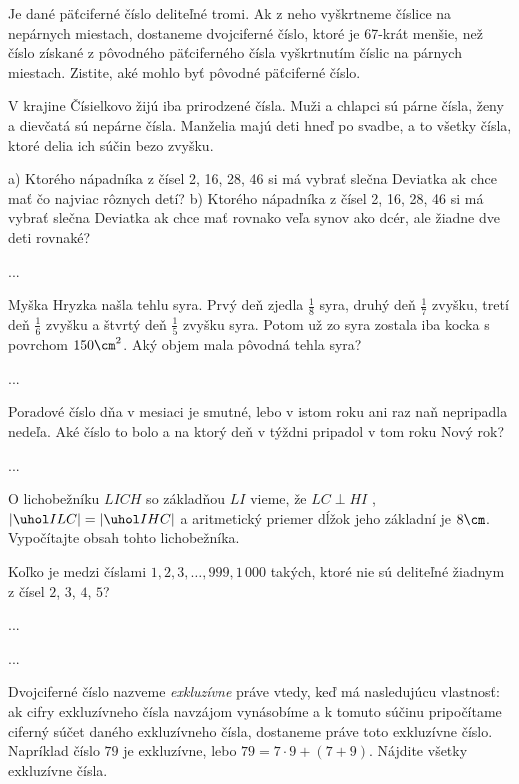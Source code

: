 {%
Je dané päťciferné číslo deliteľné tromi. Ak z neho vyškrtneme číslice na nepárnych miestach,
dostaneme dvojciferné číslo, ktoré je 67-krát menšie, než číslo získané z pôvodného
päťciferného čísla vyškrtnutím číslic na párnych miestach. Zistite, aké mohlo byť pôvodné
päťciferné číslo.}

{%
V krajine Čísielkovo žijú iba prirodzené čísla. Muži a chlapci sú párne čísla, ženy a dievčatá
sú nepárne čísla. Manželia majú deti hneď po svadbe, a to všetky čísla, ktoré delia ich súčin
bezo zvyšku.
\begin{itemize}
\ite a) Ktorého nápadníka z čísel 2, 16, 28, 46 si má vybrať slečna Deviatka ak chce mať čo
najviac rôznych detí?
\ite b) Ktorého nápadníka z čísel 2, 16, 28, 46 si má vybrať slečna Deviatka ak chce mať
rovnako veľa synov ako dcér, ale žiadne dve deti rovnaké?
\end{itemize}
}

{%
...}

{%
Myška Hryzka našla tehlu syra. Prvý deň zjedla $\frac18$ syra, druhý deň $\frac17$ zvyšku, tretí deň $\frac16$ zvyšku a štvrtý deň
$\frac15$ zvyšku syra. Potom už zo syra zostala iba kocka s povrchom $150\cm^2$.
Aký objem mala pôvodná tehla syra?}

{%
...}

{%
Poradové číslo dňa v mesiaci je smutné, lebo v istom roku ani raz naň nepripadla nedeľa. Aké
číslo to bolo a na ktorý deň v týždni pripadol v tom roku Nový rok?}

{%
...}

{%
O lichobežníku $LICH$ so základňou $LI$ vieme, že $LC\perp HI$ , $|\uhol ILC| = |\uhol IHC|$ a aritmetický
priemer dĺžok jeho základní je $8\cm$. Vypočítajte obsah tohto lichobežníka.}

{%
Koľko je medzi číslami $1,2,3,\dots,999,1\,000$ takých, ktoré nie sú deliteľné žiadnym z čísel
$2$, $3$, $4$, $5$?}

{%
...}

{%
...}

{%
Dvojciferné číslo nazveme {\it exkluzívne\/} práve vtedy, keď má nasledujúcu vlastnosť: ak cifry
exkluzívneho čísla navzájom vynásobíme a k tomuto súčinu pripočítame ciferný súčet daného
exkluzívneho čísla, dostaneme práve toto exkluzívne číslo. Napríklad číslo $79$ je exkluzívne,
lebo $79 = 7\cdot9 + (7 + 9)$. Nájdite všetky exkluzívne čísla.}

